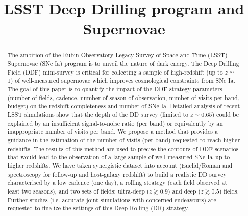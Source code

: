 \documentclass[skiphelvet,twocolumn]{lsstdescnote}
\newcommand{\sne}{{SNe Ia}}
\begin{document}
\title{LSST Deep Drilling program and Supernovae}

\maketitlepre

\begin{abstract}
  
  The ambition of the Rubin Observatory Legacy Survey of Space and Time (LSST) Supernovae (\sne) program is to unveil the nature of dark energy. %
The Deep Drilling Field (DDF) mini-survey is critical for collecting a sample of high-redshift (up to $z\simeq$1) of well-measured supernovae which improves cosmological constraints from \sne. The goal of this paper is to quantify the impact of the DDF strategy parameters (number of fields, cadence, number of season of observation, number of visits per band, budget) on the redshift completeness and number of \sne. Detailed analysis of recent LSST simulations show that the depth of the DD survey (limited to $z\sim0.65$) could be explained by an insufficient signal-to-noise ratio (per band) or equivalently by an inappropriate number of visits per band. We propose a method that provides a guidance in the estimation of the number of visits (per band) requested to reach higher redshifts. The results of this method are used to precise the contours of DDF scenarios that would lead to the observation of a large sample of well-measured \sne~up to higher redshifts. We have taken synergistic dataset into account (Euclid/Roman and spectroscopy for follow-up and host-galaxy redshift) to build a realistic DD survey characterised by a low cadence (one day), a rolling strategy (each field observed at least two seasons), and two sets of fields: ultra-deep ($z\gtrsim0.9$) and deep ($z\gtrsim0.5$) fields. Further studies (i.e. accurate joint simulations with concerned endeavours) are requested to finalize the settings of this Deep Rolling (DR) strategy.

\end{abstract}

\dockeys{}

\maketitlepost

\end{document}
